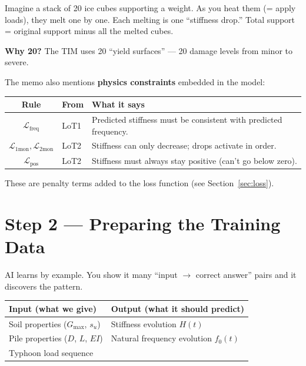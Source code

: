 \documentclass[11pt,a4paper]{article}
\begin{document}
\begin{tcolorbox}[colback=yellow!5, colframe=yellow!50!black, title=Analogy]
Imagine a stack of 20 ice cubes supporting a weight.  As you heat them
(= apply loads), they melt one by one.  Each melting is one ``stiffness
drop.''  Total support = original support minus all the melted cubes.
\end{tcolorbox}

\textbf{Why 20?}  The TIM uses 20 ``yield surfaces'' --- 20 damage levels
from minor to severe.

\medskip
The memo also mentions \textbf{physics constraints} embedded in the model:
\begin{center}
\begin{tabular}{clp{7cm}}
\toprule
\textbf{Rule} & \textbf{From} & \textbf{What it says} \\
\midrule
$\mathcal{L}_{\text{freq}}$ & LoT1 &
  Predicted stiffness must be consistent with predicted frequency. \\
$\mathcal{L}_{\text{1mon}}, \mathcal{L}_{\text{2mon}}$ & LoT2 &
  Stiffness can only decrease; drops activate in order. \\
$\mathcal{L}_{\text{pos}}$ & LoT2 &
  Stiffness must always stay positive (can't go below zero). \\
\bottomrule
\end{tabular}
\end{center}

These are penalty terms added to the loss function (see Section~\ref{sec:loss}).

\section{Step 2 --- Preparing the Training Data}
\label{sec:data}

AI learns by example.  You show it many ``input $\to$ correct answer'' pairs
and it discovers the pattern.

\begin{center}
\begin{tabular}{lp{6.5cm}}
\toprule
\textbf{Input (what we give)} & \textbf{Output (what it should predict)} \\
\midrule
Soil properties ($G_{\max}$, $s_u$) & Stiffness evolution $H(t)$ \\
Pile properties ($D$, $L$, $EI$) & Natural frequency evolution $f_0(t)$ \\
Typhoon load sequence & \\
\bottomrule
\end{tabular}
\end{center}
\end{document}
